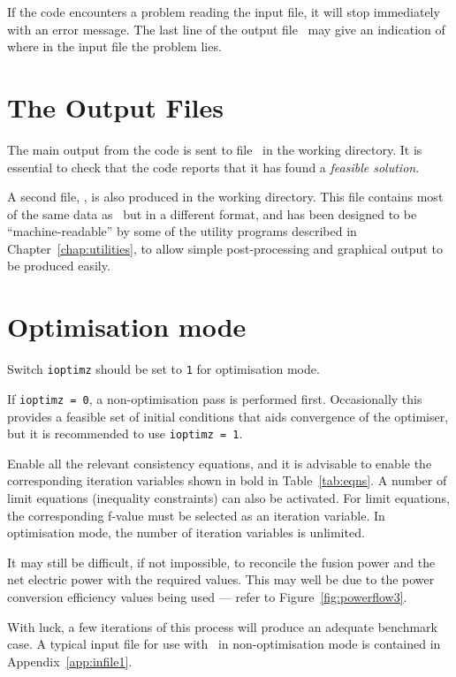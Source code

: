 If the code encounters a problem reading the input file, it will stop
immediately with an error message. The last line of the output file \outdat\
may give an indication of where in the input file the problem lies.

\section{The Output Files}

The main output from the code is sent to file \outdat\ in the working
directory.  It is essential to check that the code reports that it has found a
\textit{feasible solution}.

A second file, \mfile, is also produced in the working directory.  This file
contains most of the same data as \outdat\ but in a different format, and has
been designed to be ``machine-readable'' by some of the utility programs
described in Chapter~\ref{chap:utilities}, to allow simple post-processing and
graphical output to be produced easily.

\section{Optimisation mode}

Switch \texttt{ioptimz} should be set to \texttt{1} for optimisation mode.

If \texttt{ioptimz = 0}, a non-optimisation pass is performed first.  Occasionally this provides a feasible set of initial conditions that aids convergence of the optimiser, but it is recommended to use \texttt{ioptimz = 1}.

Enable all the relevant consistency equations, and it is advisable to enable the corresponding iteration variables shown in bold in Table~\ref{tab:eqns}. A number of limit equations (inequality constraints) can also be activated.  For limit equations, the corresponding f-value must be selected as an iteration variable.  In optimisation mode, the number of iteration variables is unlimited.

It may still be difficult, if not impossible, to reconcile the fusion power
and the net electric power with the required values. This may well be due to
the power conversion efficiency values being used --- refer to
Figure~\ref{fig:powerflow3}.

With luck, a few iterations of this process will produce an adequate benchmark
case. A typical input file for use with \process\ in non-optimisation mode is
contained in Appendix~\ref{app:infile1}.

